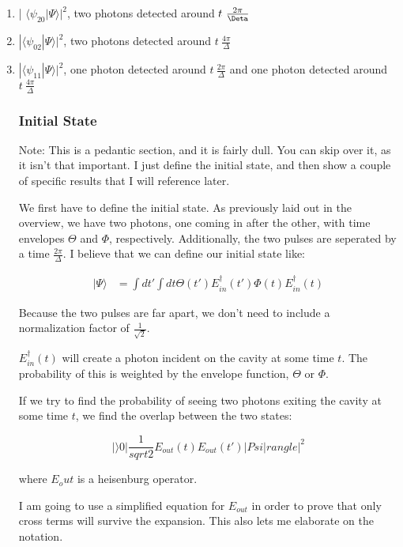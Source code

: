 \documentclass[12pt]{article}
\begin{document}
\begin{enumerate}
\item | $\langle \psi_{20} | \Psi \rangle |^2$, two photons detected around $t~\frac{2\pi}{\Deta}$
\item $ | \langle \psi_{02} | \Psi \rangle |^2 $, two photons detected around $t ~\frac{4 \pi}{\Delta}$
\item $ | \langle \psi_{11} |\Psi \rangle |^2 $, one photon detected around $t~\frac{2\pi}{\Delta}$ and one photon 
detected around $t~\frac{4\pi}{\Delta}$

\subsubsection{Initial State}
Note: This is a pedantic section, and it is fairly dull. You can skip over it, as it isn't that important. I just define the initial state, and then show a couple of specific results that I will reference later.

We first have to define the initial state. As previously laid out in the overview, we have two photons, one coming in
after the other, with time envelopes $\Theta$ and $\Phi$, respectively. Additionally, the two pulses are seperated by a time $\frac{2 \pi}{\Delta}$. I believe that we can define our initial state like:

\begin{align}
| \Psi \rangle &= \int d t' \int dt \Theta(t') E^\dagger_{in}(t') \Phi (t) E^\dagger_{in}(t)
\end{align}

Because the two pulses are far apart, we don't need to include a normalization factor of $\frac{1}{\sqrt{2}}$.

$E^\dagger_{in}(t)$ will create a photon incident on the cavity at some time $t$. The probability of this is weighted by
the envelope function, $\Theta$ or $\Phi$.

If we try to find the probability of seeing two photons exiting the cavity at some time $t$, we find the overlap between the two states:

\begin{equation}
| \rangle 0 | \frac{1}{sqrt{2}} E_{out}(t) E_{out}(t') |Psi |rangle |^2
\end{equation}

where $E_out$ is a heisenburg operator.

I am going to use a simplified equation for $E_{out}$ in order to prove that only cross terms will survive the expansion. This also lets me elaborate on the notation.


\end{enumerate}
\end{document}
